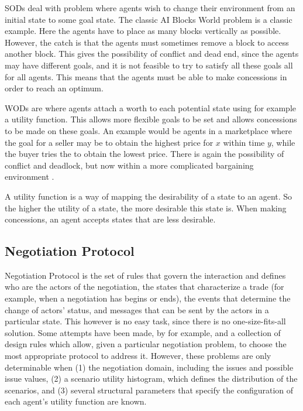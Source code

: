 SODs deal with problem where agents wish to change their environment from an initial state to some goal state. The classic AI Blocks World problem is a classic example. Here the agents have to place as many blocks vertically as possible. However, the catch is that the agents must sometimes remove a block to access another block. This gives the possibility of conflict and dead end, since the agents may have different goals, and it is not feasible to try to satisfy all these goals all for all agents. This means that the agents must be able to make concessions in order to reach an optimum. 

WODs are where agents attach a worth to each potential state using for example a utility function. This allows more flexible goals to be set and allows concessions to be made on these goals. An example would be agents in a marketplace where the goal for a seller may be to obtain the highest price for $x$ within time $y$, while the buyer tries the to obtain the lowest price. There is again the possibility of conflict and deadlock, but now within a more complicated bargaining environment \citep{anumba2003negotiation, fatima2014negotiation}.

A utility function is a way of mapping the desirability of a state to an agent. So the higher the utility of a state, the more desirable this state is. When making concessions, an agent accepts states that are less desirable. 
\subsection{Negotiation Protocol}
Negotiation Protocol is the set of rules that govern the interaction and defines who are the actors of the negotiation, the states that characterize a trade (for example, when a negotiation has begins or ends), the events that determine the change of actors’ status, and messages that can be sent by the actors in a particular state. This however is no easy task, since there is no one-size-fits-all solution. Some attempts have been made, by \citet{marsa2014problems} for example, and a collection of design rules which allow, given a particular negotiation problem, to choose the most appropriate protocol to address it. However, these problems are only determinable when (1) the negotiation domain, including the issues and possible issue values, (2) a scenario utility histogram, which defines the distribution of the scenarios, and (3) several structural parameters that specify the configuration of each agent's utility function are known.

